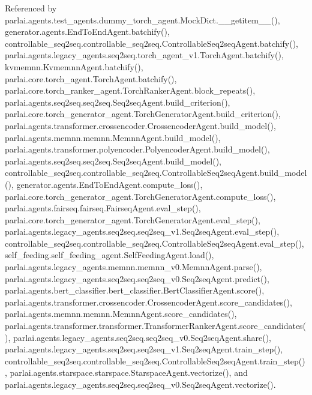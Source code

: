Referenced by parlai.\+agents.\+test\+\_\+agents.\+dummy\+\_\+torch\+\_\+agent.\+Mock\+Dict.\+\_\+\+\_\+getitem\+\_\+\+\_\+(), generator.\+agents.\+End\+To\+End\+Agent.\+batchify(), controllable\+\_\+seq2seq.\+controllable\+\_\+seq2seq.\+Controllable\+Seq2seq\+Agent.\+batchify(), parlai.\+agents.\+legacy\+\_\+agents.\+seq2seq.\+torch\+\_\+agent\+\_\+v1.\+Torch\+Agent.\+batchify(), kvmemnn.\+Kvmemnn\+Agent.\+batchify(), parlai.\+core.\+torch\+\_\+agent.\+Torch\+Agent.\+batchify(), parlai.\+core.\+torch\+\_\+ranker\+\_\+agent.\+Torch\+Ranker\+Agent.\+block\+\_\+repeats(), parlai.\+agents.\+seq2seq.\+seq2seq.\+Seq2seq\+Agent.\+build\+\_\+criterion(), parlai.\+core.\+torch\+\_\+generator\+\_\+agent.\+Torch\+Generator\+Agent.\+build\+\_\+criterion(), parlai.\+agents.\+transformer.\+crossencoder.\+Crossencoder\+Agent.\+build\+\_\+model(), parlai.\+agents.\+memnn.\+memnn.\+Memnn\+Agent.\+build\+\_\+model(), parlai.\+agents.\+transformer.\+polyencoder.\+Polyencoder\+Agent.\+build\+\_\+model(), parlai.\+agents.\+seq2seq.\+seq2seq.\+Seq2seq\+Agent.\+build\+\_\+model(), controllable\+\_\+seq2seq.\+controllable\+\_\+seq2seq.\+Controllable\+Seq2seq\+Agent.\+build\+\_\+model(), generator.\+agents.\+End\+To\+End\+Agent.\+compute\+\_\+loss(), parlai.\+core.\+torch\+\_\+generator\+\_\+agent.\+Torch\+Generator\+Agent.\+compute\+\_\+loss(), parlai.\+agents.\+fairseq.\+fairseq.\+Fairseq\+Agent.\+eval\+\_\+step(), parlai.\+core.\+torch\+\_\+generator\+\_\+agent.\+Torch\+Generator\+Agent.\+eval\+\_\+step(), parlai.\+agents.\+legacy\+\_\+agents.\+seq2seq.\+seq2seq\+\_\+v1.\+Seq2seq\+Agent.\+eval\+\_\+step(), controllable\+\_\+seq2seq.\+controllable\+\_\+seq2seq.\+Controllable\+Seq2seq\+Agent.\+eval\+\_\+step(), self\+\_\+feeding.\+self\+\_\+feeding\+\_\+agent.\+Self\+Feeding\+Agent.\+load(), parlai.\+agents.\+legacy\+\_\+agents.\+memnn.\+memnn\+\_\+v0.\+Memnn\+Agent.\+parse(), parlai.\+agents.\+legacy\+\_\+agents.\+seq2seq.\+seq2seq\+\_\+v0.\+Seq2seq\+Agent.\+predict(), parlai.\+agents.\+bert\+\_\+classifier.\+bert\+\_\+classifier.\+Bert\+Classifier\+Agent.\+score(), parlai.\+agents.\+transformer.\+crossencoder.\+Crossencoder\+Agent.\+score\+\_\+candidates(), parlai.\+agents.\+memnn.\+memnn.\+Memnn\+Agent.\+score\+\_\+candidates(), parlai.\+agents.\+transformer.\+transformer.\+Transformer\+Ranker\+Agent.\+score\+\_\+candidates(), parlai.\+agents.\+legacy\+\_\+agents.\+seq2seq.\+seq2seq\+\_\+v0.\+Seq2seq\+Agent.\+share(), parlai.\+agents.\+legacy\+\_\+agents.\+seq2seq.\+seq2seq\+\_\+v1.\+Seq2seq\+Agent.\+train\+\_\+step(), controllable\+\_\+seq2seq.\+controllable\+\_\+seq2seq.\+Controllable\+Seq2seq\+Agent.\+train\+\_\+step(), parlai.\+agents.\+starspace.\+starspace.\+Starspace\+Agent.\+vectorize(), and parlai.\+agents.\+legacy\+\_\+agents.\+seq2seq.\+seq2seq\+\_\+v0.\+Seq2seq\+Agent.\+vectorize().

